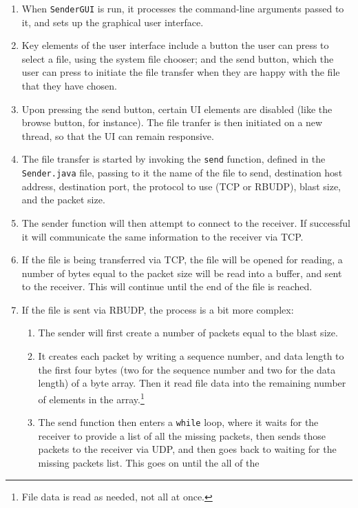 \documentclass[10pt, a4paper]{article}
\begin{document}
\begin{enumerate}
  \item When \texttt{SenderGUI} is run, it processes the command-line arguments
    passed to it, and sets up the graphical user interface.
  \item Key elements of the user interface include a button the user can press
    to select a file, using the system file chooser; and the send button, which
    the user can press to initiate the file transfer when they are happy with
    the file that they have chosen.
  \item Upon pressing the send button, certain UI elements are disabled (like
    the browse button, for instance). The file tranfer is then initiated on a
    new thread, so that the UI can remain responsive.
  \item The file transfer is started by invoking the \texttt{send} function,
    defined in the \texttt{Sender.java} file, passing to it the name of the file
    to send, destination host address, destination port, the protocol to use
    (TCP or RBUDP), blast size, and the packet size.
  \item The sender function will then attempt to connect to the receiver. If
    successful it will communicate the same information to the receiver via TCP.
  \item If the file is being transferred via TCP, the file will be opened for
    reading, a number of bytes equal to the packet size will be read into a
    buffer, and sent to the receiver. This will continue until the end of the
    file is reached.
  \item If the file is sent via RBUDP, the process is a bit more complex:
    \begin{enumerate}
      \item The sender will first create a number of packets equal to the blast
        size.
      \item It creates each packet by writing a sequence number, and data
        length to the first four bytes (two for the sequence number and two for
        the data length) of a byte array. Then it read file data into the
        remaining number of elements in the array.\footnote{File data is read
        as needed, not all at once.}
      \item The send function then enters a \texttt{while} loop, where it waits
        for the receiver to provide a list of all the missing packets, then
        sends those packets to the receiver via UDP, and then goes back to
        waiting for the missing packets list. This goes on until the all of the

\end{enumerate}
\end{enumerate}
\end{document}
